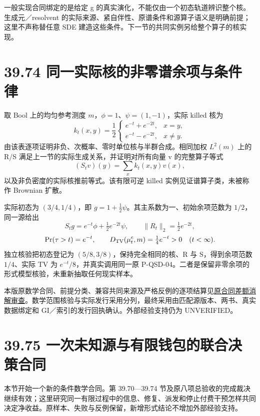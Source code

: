 \documentclass[
  11pt,
  oneside]{book}
\begin{document}
一般实现合同绑定的是给定 g 的真实演化，不能仅由一个初态轨道辨识整个核。生成元／resolvent 的实际来源、紧自伴性、原谱条件和源算子语义是明确前提；这里不声称替任意 SDE 建造这些条件。下一节的共同实例另给整个算子的核实现。

\section{39.74 同一实际核的非零谱余项与条件律}\label{ux540cux4e00ux5b9eux9645ux6838ux7684ux975eux96f6ux8c31ux4f59ux9879ux4e0eux6761ux4ef6ux5f8b}

取 Bool 上的均匀参考测度 \(m\)，\(\phi=1\)、\(\psi=(1,-1)\)，实际 killed 核为 \[k_t(x,y)=\frac12\begin{cases}
 e^{-t}+e^{-2t},&x=y,\\
 e^{-t}-e^{-2t},&x\ne y.
\end{cases}\] 由该表逐项证明非负、次概率、零时单位核与半群合成。相同加权 \(L^2(m)\) 上的 R/S 满足上一节的实际生成关系，并证明对所有向量 v 的完整算子等式 \[(S_tv)(y)=\sum_x k_t(x,y)v(x),\] 以及非负密度的实际核推前等式。该有限可逆 killed 实例见证谱算子类，未被称作 Brownian 扩散。

实际初态为 \((3/4,1/4)\)，即 \(g=1+\frac12\psi\)。其主系数为一、初始余项范数为 \(1/2\)，同一源给出 \[S_tg=e^{-t}\phi+\tfrac12e^{-2t}\psi,\qquad
\|R_t\|_2=\tfrac12e^{-2t},\] \[\Pr(\tau>t)=e^{-t},\qquad
D_{\rm TV}(\mu_t^c,m)=\tfrac14e^{-t}>0\quad(t<\infty).\] 独立核验把初态登记为 \((5/8,3/8)\)，保持完全相同的核、R 与 S，得到余项范数 \(1/4\)、实际 TV 为 \(e^{-t}/8\)，并真实调用同一原 P-QSD-04。二者是保留非零余项的形式模型核验，未重新抽取任何现实样本。

本版原数学合同、前提分类、兼容共同来源及严格反例的逐项结算见\href{../formalization/ueot-core/docs/compression/theory_completion/unified_closure/general_perron_compact_spectral_source_v1/independent/ueot-original-contract-general-gaps-discharge-review-20261103.json}{原合同差额消解审查}。数学范围核验与实际发行采用分列，最终采用由匹配源版本、两书、真实数据绑定和 GI／索引的发行回执确认。外部经验支持仍为 UNVERIFIED。

\section{39.75 一次未知源与有限钱包的联合决策合同}\label{ux4e00ux6b21ux672aux77e5ux6e90ux4e0eux6709ux9650ux94b1ux5305ux7684ux8054ux5408ux51b3ux7b56ux5408ux540c}

本节开始一个新的条件数学合同。第 39.70---39.74 节及原八项总验收的完成裁决继续有效；这里研究同一有限过程中的信息、修复、派发和停止付费干预怎样共同决定净收益。原样本、失败与反例保留，新增形式结论不增加外部经验支持。
\end{document}
